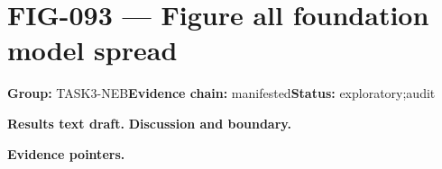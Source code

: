 \clearpage
\section{FIG-093 --- Figure all foundation model spread}
\label{figpage:fig-093}
\textbf{Group:} TASK3-NEB\quad \textbf{Evidence chain:} manifested\quad \textbf{Status:} exploratory;audit

\textbf{Results text draft.} 
\textbf{Discussion and boundary.} 


\textbf{Evidence pointers.}



\vfill

